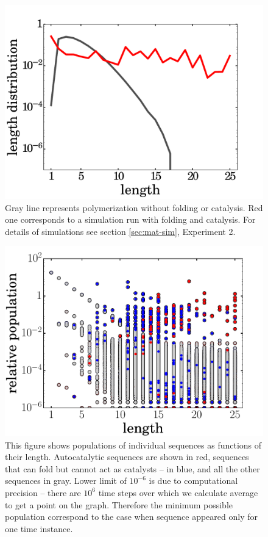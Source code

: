 \documentclass[journal=jacsat,manuscript=article,layout=twocolumn]{achemso}
\begin{document}
\begin{figure}[h!]
  \centering
  \includegraphics[width=\columnwidth]{pictures/twoDistr16.pdf} 
  \caption{\footnotesize{Gray line represents polymerization without folding or catalysis. Red one 
corresponds to a simulation run with folding and catalysis. For details of simulations see 
section \ref{sec:mat-sim}, Experiment 2. }}
  \label{fig:sim.flory-fold}
\end{figure}
\begin{figure}[h!]
  \centering
  \includegraphics[width=\columnwidth]{pictures/scatter0101-26.png} 
  \caption{\footnotesize{This figure shows populations of individual sequences as functions of 
their length. Autocatalytic sequences are shown in red, sequences that can fold but cannot act as 
catalysts -- in blue, and all the other sequences in gray. Lower limit of $10^{-6}$ is due to 
computational precision -- there are $10^6$ time steps over which we calculate average to get a 
point on the graph. Therefore the minimum possible population correspond to the case when sequence 
appeared only for one time instance.}}
  \label{fig:stats-scatter-018}
\end{figure}
\end{document}
